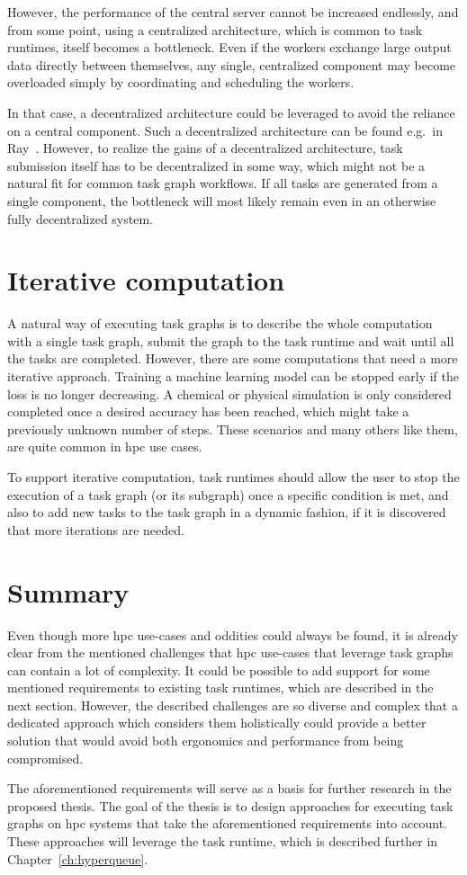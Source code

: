 \begin{description}
		However, the performance of the central server cannot be increased endlessly, and from some point,
		using a centralized architecture, which is common to task runtimes, itself becomes a bottleneck.
		Even if the workers exchange large output data directly between themselves, any single, centralized
		component may become overloaded simply by coordinating and scheduling the workers.

		In that case, a decentralized architecture could be leveraged to avoid the reliance on a central
		component. Such a decentralized architecture can be found e.g.\ in Ray~\cite{ray}.
		However, to realize the gains of a decentralized architecture, task submission itself has to be
		decentralized in some way, which might not be a natural fit for common task graph workflows. If all
		tasks are generated from a single component, the bottleneck will most likely remain even in an
		otherwise fully decentralized system.
\end{description}

\section{Iterative computation}
A natural way of executing task graphs is to describe the whole computation with a single task
graph, submit the graph to the task runtime and wait until all the tasks are completed. However,
there are some computations that need a more iterative approach. Training a machine learning model
can be stopped early if the loss is no longer decreasing. A chemical or physical simulation is only
considered completed once a desired accuracy has been reached, which might take a previously
unknown number of steps. These scenarios and many others like them, are quite common in
\gls{hpc} use cases.

To support iterative computation, task runtimes should allow the user to stop the execution of a
task graph (or its subgraph) once a specific condition is met, and also to add new tasks to the
task graph in a dynamic fashion, if it is discovered that more iterations are needed.

\section{Summary}
Even though more \gls{hpc} use-cases and oddities could always be found, it is
already clear from the mentioned challenges that \gls{hpc} use-cases that
leverage task graphs can contain a lot of complexity. It could be possible to add support for some
mentioned requirements to existing task runtimes, which are described in the next section. However,
the described challenges are so diverse and complex that a dedicated approach which considers them
holistically could provide a better solution that would avoid both ergonomics and performance from
being compromised.

The aforementioned requirements will serve as a basis for further research in the proposed thesis.
The goal of the thesis is to design approaches for executing task graphs on
\gls{hpc} systems that take the aforementioned requirements into account. These
approaches will leverage the \hyperqueue{} task runtime, which is described further
in Chapter~\ref{ch:hyperqueue}.

